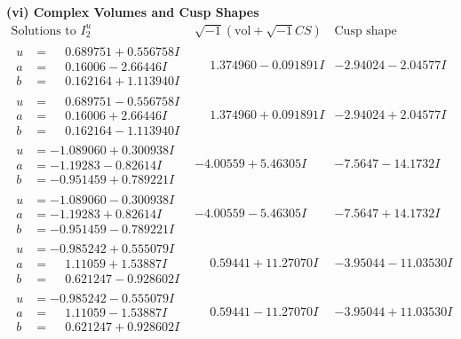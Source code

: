 \documentclass[1p]{elsarticle_modified}
\theoremstyle{definition}
\newcommand{\I}{\sqrt{-1}}
\begin{document}
\newpage\flushleft \textbf{(vi) Complex Volumes and Cusp Shapes}
$$\begin{array}{c|c|c}  
\text{Solutions to }I^u_{2}& \I (\text{vol} + \sqrt{-1}CS) & \text{Cusp shape}\\
 \hline 
\begin{aligned}
u &= \phantom{-}0.689751 + 0.556758 I \\
a &= \phantom{-}0.16006 - 2.66446 I \\
b &= \phantom{-}0.162164 + 1.113940 I\end{aligned}
 & \phantom{-}1.374960 - 0.091891 I & -2.94024 - 2.04577 I \\ \hline\begin{aligned}
u &= \phantom{-}0.689751 - 0.556758 I \\
a &= \phantom{-}0.16006 + 2.66446 I \\
b &= \phantom{-}0.162164 - 1.113940 I\end{aligned}
 & \phantom{-}1.374960 + 0.091891 I & -2.94024 + 2.04577 I \\ \hline\begin{aligned}
u &= -1.089060 + 0.300938 I \\
a &= -1.19283 - 0.82614 I \\
b &= -0.951459 + 0.789221 I\end{aligned}
 & -4.00559 + 5.46305 I & -7.5647 - 14.1732 I \\ \hline\begin{aligned}
u &= -1.089060 - 0.300938 I \\
a &= -1.19283 + 0.82614 I \\
b &= -0.951459 - 0.789221 I\end{aligned}
 & -4.00559 - 5.46305 I & -7.5647 + 14.1732 I \\ \hline\begin{aligned}
u &= -0.985242 + 0.555079 I \\
a &= \phantom{-}1.11059 + 1.53887 I \\
b &= \phantom{-}0.621247 - 0.928602 I\end{aligned}
 & \phantom{-}0.59441 + 11.27070 I & -3.95044 - 11.03530 I \\ \hline\begin{aligned}
u &= -0.985242 - 0.555079 I \\
a &= \phantom{-}1.11059 - 1.53887 I \\
b &= \phantom{-}0.621247 + 0.928602 I\end{aligned}
 & \phantom{-}0.59441 - 11.27070 I & -3.95044 + 11.03530 I \\ \hline\begin{aligned}

\end{aligned}
\end{array}$$
\end{document}
